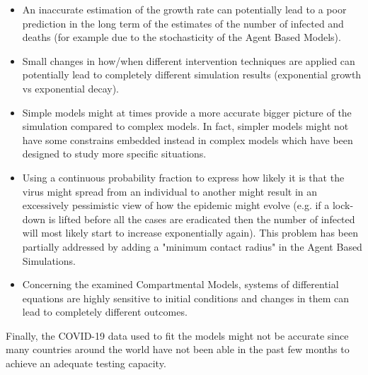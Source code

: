 \begin{itemize}
    \item An inaccurate estimation of the growth rate can potentially lead to a poor prediction in the long term of the estimates of the number of infected and deaths (for example due to the stochasticity of the Agent Based Models).
    \item Small changes in how/when different intervention techniques are applied can potentially lead to completely different simulation results (exponential growth vs exponential decay).
    \item Simple models might at times provide a more accurate bigger picture of the simulation compared to complex models. In fact, simpler models might not have some constrains embedded instead in complex models which have been designed to study more specific situations.
    \item Using a continuous probability fraction to express how likely it is that the virus might spread from an individual to another might result in an excessively pessimistic view of how the epidemic might evolve (e.g. if a lock-down is lifted before all the cases are eradicated then the number of infected will most likely start to increase exponentially again). This problem has been partially addressed by adding a "minimum contact radius" in the Agent Based Simulations. 
    \item Concerning the examined Compartmental Models, systems of differential equations are highly sensitive to initial conditions and changes in them can lead to completely different outcomes.
\end{itemize}

Finally, the COVID-19 data used to fit the models might not be accurate since many countries around the world have not been able in the past few months to achieve an adequate testing capacity.
